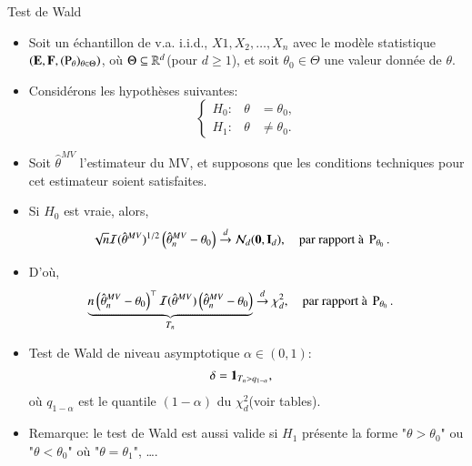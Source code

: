 \begin{frame}
    [allowframebreaks]{Test de Wald}
    \begin{itemize}
        \item Soit un échantillon de v.a. i.i.d., $X1, X_2,\ldots, X_n$ avec le modèle statistique 
        $\left(\mathbf{E}, \mathbf{F}, (\operatorname{P}_{\theta})_{\theta\in\Theta}\right)$, où $\Theta\subseteq \mathbb{R}^d$(pour $d\geq 1$), et soit $\theta_0\in\Theta$ une valeur donnée de $\theta$. 
        \item Considérons les hypothèses suivantes: \[\left\{
            \begin{array}{lll}
                H_0:&\theta  &= \theta_0,\\
                H_1:&\theta  &\neq \theta_0.
            \end{array}
        \right.\]
            \item Soit $\hat{\theta}^{MV}$ l'estimateur du MV, et supposons que les conditions techniques pour cet estimateur soient 
            satisfaites.
            \item Si $H_0$ est vraie, alors,\begin{align*}
                \sqrt{n} \mathcal{I}(\hat{\theta}^{MV})^{1/2}\left(\hat{\theta}_n^{MV}-\theta_0\right) 
                &\overset{d}{\rightarrow} \mathcal{N}_d({\mathbf 0}, \mathbf{I}_d), \quad \text{par rapport à }  \operatorname{P}_{\theta_0}.
            \end{align*}
        \framebreak
        \item D'où, \begin{align*}
            \underbrace{n\left(\hat{\theta}_n^{MV}-\theta_0\right)^\top\mathcal{I}(\hat{\theta}^{MV})\left(\hat{\theta}_n^{MV}-\theta_0\right)}_{T_n}
            &\overset{d}{\rightarrow} \chi_d^2, \quad \text{par rapport à }  \operatorname{P}_{\theta_0}.
        \end{align*}
        \item Test de Wald de niveau asymptotique $\alpha\in(0,1)$:\begin{align*}
            \delta &=\mathbf{1}_{T_n>q_{1-\alpha}},
        \end{align*}
        où $q_{1-\alpha}$ est le quantile $(1-\alpha)$ du $\chi^2_d$(voir tables).
        \item Remarque: le test de Wald est aussi valide si $H_1$ présente la forme "$\theta > \theta_0$" ou 
        "$\theta < \theta_0$" où "$\theta = \theta_1$", \ldots.
    \end{itemize}
\end{frame}
